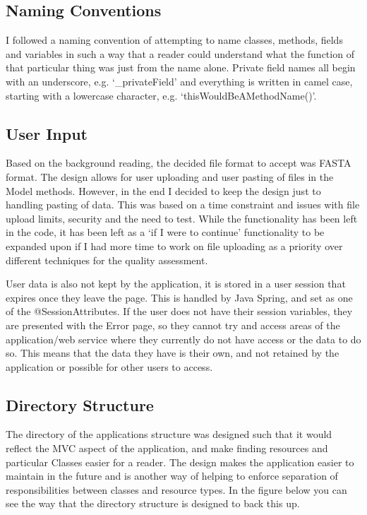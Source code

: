 \subsection{Naming Conventions}
I followed a naming convention of attempting to name classes, methods, fields and variables in such a way that a reader could understand what the function of that particular thing was just from the name alone. Private field names all begin with an underscore, e.g. `\_privateField' and everything is written in camel case, starting with a lowercase character, e.g. `thisWouldBeAMethodName()'.

\subsection{User Input}
Based on the background reading, the decided file format to accept was FASTA format. The design allows for user uploading and user pasting of files in the Model methods. However, in the end I decided to keep the design just to handling pasting of data. This was based on a time constraint and issues with file upload limits, security and the need to test. While the functionality has been left in the code, it has been left as a `if I were to continue' functionality to be expanded upon if I had more time to work on file uploading as a priority over different techniques for the quality assessment.

User data is also not kept by the application, it is stored in a user session that expires once they leave the page. This is handled by Java Spring, and set as one of the @SessionAttributes. If the user does not have their session variables, they are presented with the Error page, so they cannot try and access areas of the application/web service where they currently do not have access or the data to do so. This means that the data they have is their own, and not retained by the application or possible for other users to access.

\subsection{Directory Structure}
The directory of the applications structure was designed such that it would reflect the MVC aspect of the application, and make finding resources and particular Classes easier for a reader. The design makes the application easier to maintain in the future and is another way of helping to enforce separation of responsibilities between classes and resource types. In the figure below you can see the way that the directory structure is designed to back this up.

